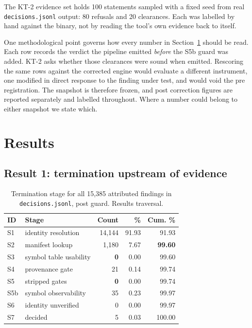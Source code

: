 The KT-2 evidence set holds 100 statements sampled with a fixed seed from real
\texttt{decisions.jsonl} output: 80 refusals and 20 clearances. Each was labelled
by hand against the binary, not by reading the tool's own evidence back to
itself.

One methodological point governs how every number in Section~\ref{sec:results}
should be read. Each row records the verdict the pipeline emitted \emph{before}
the S5b guard was added. KT-2 asks whether those clearances were sound when
emitted. Rescoring the same rows against the corrected engine would evaluate a
different instrument, one modified in direct response to the finding under test,
and would void the pre registration. The snapshot is therefore frozen, and post
correction figures are reported separately and labelled throughout. Where a
number could belong to either snapshot we state which.

\section{Results}
\label{sec:results}

\subsection{Result 1: termination upstream of evidence}

\begin{table}[t]
\caption{Termination stage for all 15,385 attributed findings in
\texttt{decisions.jsonl}, post guard. Results traversal.}
\label{tab:histogram}
\centering
\begin{tabular}{@{}llrrr@{}}
\toprule
ID & Stage & Count & \% & Cum. \% \\
\midrule
S1 & identity resolution & 14,144 & 91.93 & 91.93 \\
S2 & manifest lookup & 1,180 & 7.67 & \textbf{99.60} \\
S3 & symbol table usability & \textbf{0} & 0.00 & 99.60 \\
S4 & provenance gate & 21 & 0.14 & 99.74 \\
S5 & stripped gates & \textbf{0} & 0.00 & 99.74 \\
S5b & symbol observability & 35 & 0.23 & 99.97 \\
S6 & identity unverified & 0 & 0.00 & 99.97 \\
S7 & decided & 5 & 0.03 & 100.00 \\
\bottomrule
\end{tabular}
\end{table}

